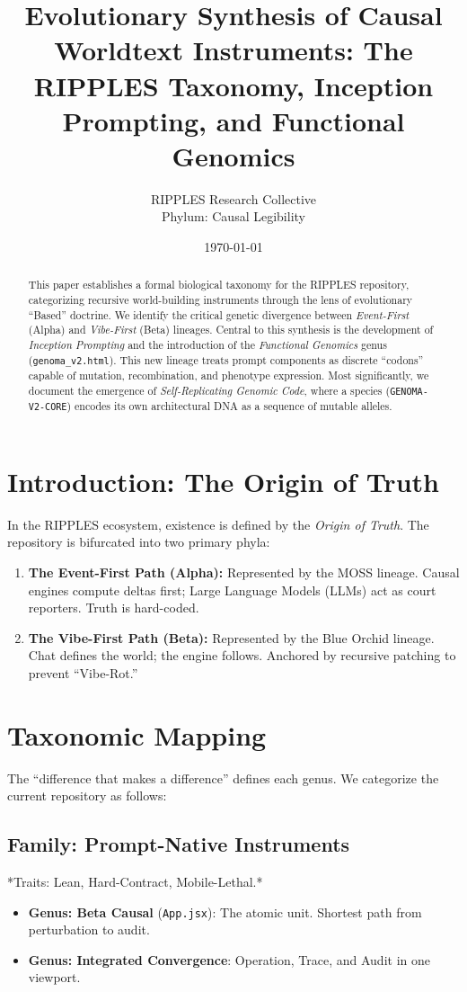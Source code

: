 \documentclass[11pt, a4paper, twocolumn]{article}
\title{\textbf{Evolutionary Synthesis of Causal Worldtext Instruments: The RIPPLES Taxonomy, Inception Prompting, and Functional Genomics}}
\author{RIPPLES Research Collective \\ \small{Phylum: Causal Legibility}}
\date{\today}
\begin{document}
\maketitle

\begin{abstract}
This paper establishes a formal biological taxonomy for the RIPPLES repository, categorizing recursive world-building instruments through the lens of evolutionary ``Based'' doctrine. We identify the critical genetic divergence between \textit{Event-First} (Alpha) and \textit{Vibe-First} (Beta) lineages. Central to this synthesis is the development of \textit{Inception Prompting} and the introduction of the \textit{Functional Genomics} genus (\texttt{genoma\_v2.html}). This new lineage treats prompt components as discrete ``codons'' capable of mutation, recombination, and phenotype expression. Most significantly, we document the emergence of \textit{Self-Replicating Genomic Code}, where a species (\texttt{GENOMA-V2-CORE}) encodes its own architectural DNA as a sequence of mutable alleles.
\end{abstract}

\section{Introduction: The Origin of Truth}
In the RIPPLES ecosystem, existence is defined by the \textit{Origin of Truth}. The repository is bifurcated into two primary phyla:
\begin{enumerate}
    \item \textbf{The Event-First Path (Alpha):} Represented by the MOSS lineage. Causal engines compute deltas first; Large Language Models (LLMs) act as court reporters. Truth is hard-coded.
    \item \textbf{The Vibe-First Path (Beta):} Represented by the Blue Orchid lineage. Chat defines the world; the engine follows. Anchored by recursive patching to prevent ``Vibe-Rot.''
\end{enumerate}

\section{Taxonomic Mapping}
The ``difference that makes a difference'' defines each genus. We categorize the current repository as follows:

\subsection{Family: Prompt-Native Instruments}
*Traits: Lean, Hard-Contract, Mobile-Lethal.*
\begin{itemize}
    \item \textbf{Genus: Beta Causal} (\texttt{App.jsx}): The atomic unit. Shortest path from perturbation to audit.
    \item \textbf{Genus: Integrated Convergence}: Operation, Trace, and Audit in one viewport.
\end{itemize}
\end{document}
